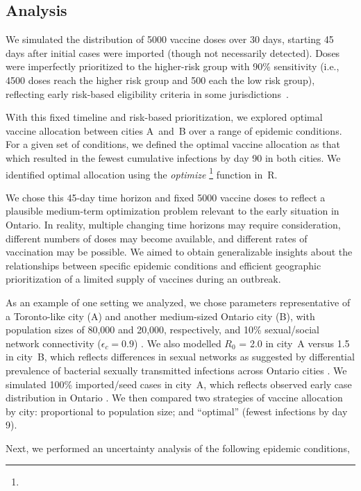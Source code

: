 \subsection{Analysis}
We simulated the distribution of 5000 vaccine doses over 30 days,
starting 45 days after initial cases were imported (though not necessarily detected).
Doses were imperfectly prioritized to the higher-risk group with 90\% sensitivity
(i.e., 4500 doses reach the higher risk group and 500 each the low risk group),
reflecting early risk-based eligibility criteria in some jurisdictions~\cite{TPH2022vax}.
\par
With this fixed timeline and risk-based prioritization,
we explored optimal vaccine allocation between cities A~and~B
over a range of epidemic conditions.
For a given set of conditions, we defined the optimal vaccine allocation as that which
resulted in the fewest cumulative infections by day 90 in both cities.
We identified optimal allocation using the \emph{optimize}%
\footnote{}
function in~R.
\par
We chose this 45-day time horizon and fixed 5000 vaccine doses to reflect
a plausible medium-term optimization problem relevant to the early \MPXV situation in Ontario.
In reality, multiple changing time horizons may require consideration,
different numbers of doses may become available, and
different rates of vaccination may be possible.
We aimed to obtain generalizable insights about the relationships between
specific epidemic conditions and efficient geographic prioritization of
a limited supply of vaccines during an outbreak.
\par
As an example of one setting we analyzed, we chose parameters representative of
a Toronto-like city (A) and another medium-sized Ontario city (B),
with \GBMSM population sizes of 80,000 and 20,000, respectively,
and 10\% sexual/social network connectivity ($\epsilon_c = 0.9$) \cite{Armstrong2020}.
We also modelled $R_0$ = 2.0 in city~A versus 1.5 in city~B,
which reflects differences in sexual networks as suggested by differential prevalence of
bacterial sexually transmitted infections across Ontario cities \cite{Gesink2014,Hart2021}.
We simulated 100\% imported/seed cases in city~A,
which reflects observed early \MPXV case distribution in Ontario \cite{PHO2022ont}.
We then compared two strategies of vaccine allocation by city:
proportional to population size; and
``optimal'' (fewest infections by day 9).
\par
Next, we performed an uncertainty analysis of the following epidemic conditions,
